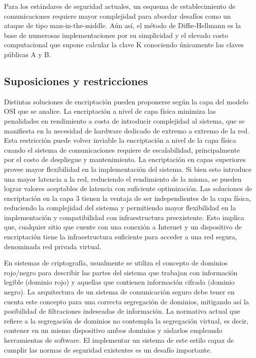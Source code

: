 \documentclass[12pt]{article}
\begin{document}
Para los estándares de seguridad actuales, un esquema de establecimiento de comunicaciones requiere mayor complejidad para abordar desafíos como un ataque de tipo man-in-the-middle. Aún así, el método de Diffie-Hellmann es la base de numerosas implementaciones por su simplicidad y el elevado costo computacional que supone calcular la clave K conociendo únicamente las claves públicas A y B.
\newpage
\subsection{Suposiciones y restricciones}
Distintas soluciones de encriptación pueden proponerse según la capa del modelo OSI que se analice. La encriptación a nivel de capa física minimiza las penalidades en rendimiento a costa de introducir complejidad al sistema, que se manifiesta en la necesidad de hardware dedicado de extremo a extremo de la red. Esta restricción puede volver inviable la encriptación a nivel de la capa física cuando el sistema de comunicaciones requiere de escalabilidad, principalmente por el costo de despliegue y mantenimiento.
La encriptación en capas superiores provee mayor flexibilidad en la implementación del sistema. Si bien esto introduce una mayor latencia a la red, reduciendo el rendimiento de la misma, se pueden lograr valores aceptables de latencia con suficiente optimización.  
Las soluciones de encriptación en la capa 3 tienen la ventaja de ser independientes de la capa física, reduciendo la complejidad del sistema y permitiendo mayor flexibilidad en la implementación y compatibilidad con infraestructura preexistente. Esto implica que, cualquier sitio que cuente con una conexión a Internet y un dispositivo de encriptación tiene la infraestructura suficiente para acceder a una red segura, denominada red privada virtual.

En sistemas de criptografía, usualmente se utiliza el concepto de dominios rojo/negro para describir las partes del sistema que trabajan con información legible (dominio rojo) y aquellas que contienen información cifrada (dominio negro). La arquitectura de un sistema de comunicación seguro debe tener en cuenta este concepto para una correcta segregación de dominios, mitigando así la posibilidad de filtraciones indeseadas de información. La normativa actual que refiere a la segregación de dominios no contempla la segregación virtual, es decir, contener en un mismo dispositivo ambos dominios y aislarlos empleando herramientas de software. El implementar un sistema de este estilo capaz de cumplir las normas de seguridad existentes es un desafío importante.
\end{document}
